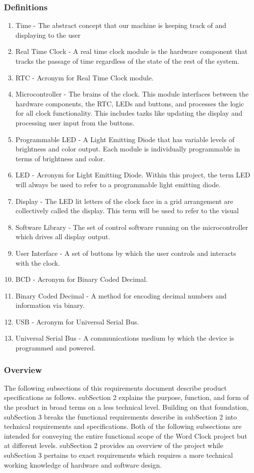 \documentclass[onecolumn, draftclsnofoot,10pt, compsoc]{IEEEtran}
\begin{document}
\subsubsection{Definitions}
\begin{enumerate}
  \item Time - The abstract concept that our machine is keeping track of and displaying to the user
  \item Real Time Clock - A real time clock module is the hardware component that tracks the passage
  of time regardless of the state of the rest of the system.
  \item RTC - Acronym for Real Time Clock module.
  \item Microcontroller - The brains of the clock. This module interfaces between the hardware
  components, the RTC, LEDs and buttons, and processes the logic for all clock functionality.
  This includes tazks like updating the display and processing user input from the buttons.
  \item Programmable LED - A Light Emitting Diode that has variable levels of brightness and
  color output. Each module is individually programmable in terms of brightness and color.
  \item LED - Acronym for Light Emitting Diode. Within this project, the term LED will always
  be used to refer to a programmable light emitting diode.
  \item Display - The LED lit letters of the clock face in a grid arrangement are collectively
  called the display. This term will be used to refer to the visual
  \item Software Library - The set of control software running on the microcontroller which drives all display output.
  \item User Interface - A set of buttons by which the user controls and interacts with the clock.
  \item BCD - Acronym for Binary Coded Decimal.
  \item Binary Coded Decimal - A method for encoding decimal numbers and information via binary.
  \item USB - Acronym for Universal Serial Bus.
  \item Universal Serial Bus - A communications medium by which the device is programmed and  powered.
\end{enumerate}

\subsubsection{Overview}
The following subsections of this requirements document describe product specifications as follows.
subSection 2 explains the purpose, function, and form of the product in broad terms on a less
technical level. Building on that foundation, subSection 3 breaks the functional requirements
describe in subSection 2 into technical requirements and specifications.
    Both of the following subsections are intended for conveying the entire functional
scope of the Word Clock project but at different levels. subSection 2 provides an overview of the
project while subSection 3 pertains to exact requirements which requires a more technical working
knowledge of hardware and software design.
\end{document}
